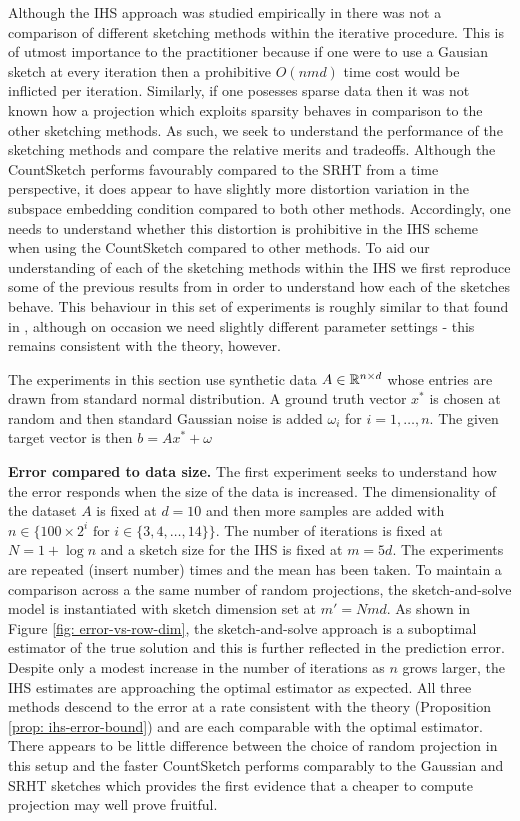 

Although the IHS approach was studied empirically in \cite{pilanci2016iterative}
there was not a comparison of different sketching methods within the iterative
procedure.
This is of utmost importance to the practitioner because if one were to use a
Gausian sketch at every iteration then a prohibitive $O(nmd)$ time cost
would be inflicted per iteration.
Similarly, if one posesses sparse data then it was not known how a projection
which exploits sparsity behaves in comparison to the other sketching methods.
As such, we seek to understand the performance of the sketching methods
and compare the relative merits and tradeoffs.
Although the CountSketch performs favourably compared to the SRHT from a time
perspective, it does appear to have slightly more distortion variation in the
subspace embedding condition compared to both other methods.
Accordingly, one needs to understand whether this distortion is prohibitive in
the IHS scheme when using the CountSketch compared to other methods.
To aid our understanding of each of the sketching methods within the IHS we
first
reproduce some of the previous results from \cite{pilanci2016iterative} in order
to understand how each of the sketches behave.
This behaviour in this set of experiments is roughly similar to that found in
\cite{pilanci2016iterative}, although on occasion we need slightly different
parameter settings - this remains consistent with the theory, however.

The experiments in this section use synthetic data $A \in \mathbb{R}^{n \times d}$
whose entries are drawn from standard normal distribution.
A ground truth vector $x^*$ is chosen at random and then standard Gaussian
noise is added $\omega_i$ for $i=1, \ldots, n$.
The given target vector is then $b = Ax^* + \omega$




\textbf{Error compared to data size.}
The first experiment seeks to understand how the error responds when the size of
the data is increased.
The dimensionality of the dataset $A$ is fixed at $d=10$ and then more samples
are added with $n \in \{100 \times 2^i \text{ for } i \in \{3,4,\ldots,14\} \}$.
The number of iterations is fixed at $N=1+\log n$ and a sketch size for the IHS
is fixed at $m=5d$.
The experiments are repeated (insert number) times and the mean has been taken.
To maintain a comparison across a the same number of random projections, the
sketch-and-solve model is instantiated with sketch dimension set at $m'=Nmd$.
As shown in Figure \ref{fig: error-vs-row-dim}, the sketch-and-solve approach
is a suboptimal estimator of the true solution and this is further reflected in
the prediction error.
Despite only a modest increase in the number of iterations as $n$ grows larger,
the IHS estimates are approaching the optimal estimator as expected.
All three methods descend to the error at a rate consistent with the theory
(Proposition \ref{prop: ihs-error-bound}) and are each comparable with the
optimal estimator.
There appears to be little difference between the choice of random projection in
this setup and the faster CountSketch performs comparably to the Gaussian
 and
SRHT sketches which provides the first evidence that a cheaper to compute
projection may well prove fruitful.

